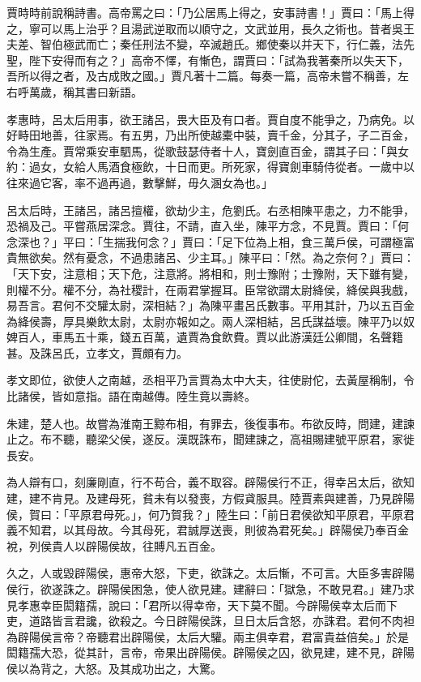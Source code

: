 \begin{pinyinscope}
賈時時前說稱詩書。高帝罵之曰：「乃公居馬上得之，安事詩書！」賈曰：「馬上得之，寧可以馬上治乎？且湯武逆取而以順守之，文武並用，長久之術也。昔者吳王夫差、智伯極武而亡；秦任刑法不變，卒滅趙氏。鄉使秦以并天下，行仁義，法先聖，陛下安得而有之？」高帝不懌，有慚色，謂賈曰：「試為我著秦所以失天下，吾所以得之者，及古成敗之國。」賈凡著十二篇。每奏一篇，高帝未嘗不稱善，左右呼萬歲，稱其書曰新語。

孝惠時，呂太后用事，欲王諸呂，畏大臣及有口者。賈自度不能爭之，乃病免。以好畤田地善，往家焉。有五男，乃出所使越橐中裝，賣千金，分其子，子二百金，令為生產。賈常乘安車駟馬，從歌鼓瑟侍者十人，寶劍直百金，謂其子曰：「與女約：過女，女給人馬酒食極飲，十日而更。所死家，得寶劍車騎侍從者。一歲中以往來過它客，率不過再過，數擊鮮，毋久溷女為也。」

呂太后時，王諸呂，諸呂擅權，欲劫少主，危劉氏。右丞相陳平患之，力不能爭，恐禍及己。平嘗燕居深念。賈往，不請，直入坐，陳平方念，不見賈。賈曰：「何念深也？」平曰：「生揣我何念？」賈曰：「足下位為上相，食三萬戶侯，可謂極富貴無欲矣。然有憂念，不過患諸呂、少主耳。」陳平曰：「然。為之奈何？」賈曰：「天下安，注意相；天下危，注意將。將相和，則士豫附；士豫附，天下雖有變，則權不分。權不分，為社稷計，在兩君掌握耳。臣常欲謂太尉絳侯，絳侯與我戲，易吾言。君何不交驩太尉，深相結？」為陳平畫呂氏數事。平用其計，乃以五百金為絳侯壽，厚具樂飲太尉，太尉亦報如之。兩人深相結，呂氏謀益壞。陳平乃以奴婢百人，車馬五十乘，錢五百萬，遺賈為食飲費。賈以此游漢廷公卿間，名聲籍甚。及誅呂氏，立孝文，賈頗有力。

孝文即位，欲使人之南越，丞相平乃言賈為太中大夫，往使尉佗，去黃屋稱制，令比諸侯，皆如意指。語在南越傳。陸生竟以壽終。

朱建，楚人也。故嘗為淮南王黥布相，有罪去，後復事布。布欲反時，問建，建諫止之。布不聽，聽梁父侯，遂反。漢既誅布，聞建諫之，高祖賜建號平原君，家徙長安。

為人辯有口，刻廉剛直，行不苟合，義不取容。辟陽侯行不正，得幸呂太后，欲知建，建不肯見。及建母死，貧未有以發喪，方假貣服具。陸賈素與建善，乃見辟陽侯，賀曰：「平原君母死。」，何乃賀我？」陸生曰：「前日君侯欲知平原君，平原君義不知君，以其母故。今其母死，君誠厚送喪，則彼為君死矣。」辟陽侯乃奉百金裞，列侯貴人以辟陽侯故，往賻凡五百金。

久之，人或毀辟陽侯，惠帝大怒，下吏，欲誅之。太后慚，不可言。大臣多害辟陽侯行，欲遂誅之。辟陽侯困急，使人欲見建。建辭曰：「獄急，不敢見君。」建乃求見孝惠幸臣閎籍孺，說曰：「君所以得幸帝，天下莫不聞。今辟陽侯幸太后而下吏，道路皆言君讒，欲殺之。今日辟陽侯誅，旦日太后含怒，亦誅君。君何不肉袒為辟陽侯言帝？帝聽君出辟陽侯，太后大驩。兩主俱幸君，君富貴益倍矣。」於是閎籍孺大恐，從其計，言帝，帝果出辟陽侯。辟陽侯之囚，欲見建，建不見，辟陽侯以為背之，大怒。及其成功出之，大驚。


\end{pinyinscope}

